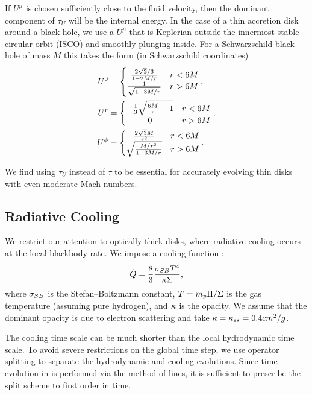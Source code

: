 If $U^\mu$ is chosen sufficiently close to the fluid velocity, then the dominant component of $\tau_U$ will be the internal energy.  In the case of a thin accretion disk around a black hole, we use a $U^\mu$ that is Keplerian outside the innermost stable circular orbit (ISCO) and smoothly plunging inside.  For a Schwarzschild black hole of mass $M$ this takes the form (in Schwarzschild coordinates)
\begin{align}
	U^0 &= \left \{ \begin{matrix} \frac{2\sqrt{2}/3}{1-2M/r} & r < 6M \\
						\frac{1}{\sqrt{1-3M/r}} & r > 6M \end{matrix} \right . , \nonumber \\
	U^r &= \left \{ \begin{matrix} -\frac{1}{3}\sqrt{\frac{6M}{r}-1} & r < 6M \\
						0 & r > 6M \end{matrix} \right . , \nonumber \\
	U^\phi &= \left \{ \begin{matrix}  \frac{2 \sqrt{3} M}{r^2} & r < 6M \\
						\sqrt{\frac{M/r^3}{1-3M/r}} & r > 6M \end{matrix} \right . . \eqlabel{Ugeo}
\end{align}


We find using $\tau_U$ instead of $\tau$ to be essential for accurately evolving thin disks with even moderate Mach numbers.

\subsection{Radiative Cooling}

We restrict our attention to optically thick disks, where radiative cooling occurs at the local blackbody rate. We impose a cooling function \citep{Novikov73, FrankKingRaine}:
\begin{equation}
	\dot{Q} = \frac{8}{3} \frac{\sig_{SB} T^4}{\ka \Sig} , \eqlabel{BBcooling}
\end{equation}
where $\sigma_{SB}$ is the Stefan--Boltzmann constant, $T = m_p \Pi / \Sigma$ is the gas temperature (assuming pure hydrogen), and $\kappa $ is the opacity.  We assume that the dominant opacity is due to electron scattering and take $\kappa = \kappa_{es} = 0.4 cm^2/g$.

The cooling time scale can be much shorter than the local hydrodynamic time scale.  To avoid severe restrictions on the global time step, we use operator splitting to separate the hydrodynamic and cooling evolutions.  Since time evolution in \Disco{} is performed via the method of lines, it is sufficient to prescribe the split scheme to first order in time.

